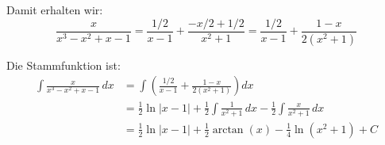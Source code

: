 \documentclass{article}
\begin{document}
Damit erhalten wir:
$$\frac{x}{x^3-x^2+x-1} = \frac{1/2}{x-1} + \frac{-x/2 + 1/2}{x^2+1} = \frac{1/2}{x-1} + \frac{1-x}{2(x^2+1)}$$

Die Stammfunktion ist:
\begin{align*}
\int \frac{x}{x^3-x^2+x-1} \, dx &= \int \left(\frac{1/2}{x-1} + \frac{1-x}{2(x^2+1)}\right) dx\\
&= \frac{1}{2}\ln|x-1| + \frac{1}{2}\int \frac{1}{x^2+1} \, dx - \frac{1}{2}\int \frac{x}{x^2+1} \, dx\\
&= \frac{1}{2}\ln|x-1| + \frac{1}{2}\arctan(x) - \frac{1}{4}\ln(x^2+1) + C
\end{align*}
\end{document}
